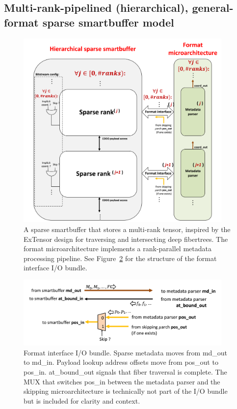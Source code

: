 \subsection{Multi-rank-pipelined (hierarchical), general-format sparse smartbuffer model}

\begin{figure}[ht]
    \centering
    \includegraphics[width=0.95\textwidth]{figures/hierarchical_general_format_sparse_smartbuffer.png}
    \caption{A sparse smartbuffer that stores a multi-rank tensor, inspired by the ExTensor\cite{extensor} design for traversing and intersecting deep fibertrees. The format microarchitecture implements a rank-parallel metadata processing pipeline. See Figure~\ref{fig:format_interface} for the structure of the format interface I/O bundle.}
    \label{fig:hierarchical_general_format_sparse_smartbuffer}
\end{figure}

\begin{figure}[ht]
    \centering
    \includegraphics[width=0.95\textwidth]{figures/format_interface.png}
    \caption{Format interface I/O bundle. Sparse metadata moves from md\_out to md\_in. Payload lookup address offsets move from pos\_out to pos\_in. at\_bound\_out signals that fiber traversal is complete. The MUX that switches pos\_in between the metadata parser and the skipping microarchitecture is technically not part of the I/O bundle but is included for clarity and context.}
    \label{fig:format_interface}
\end{figure}